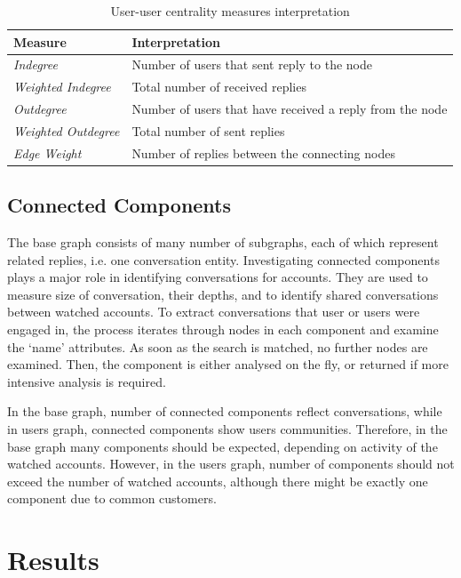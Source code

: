 \documentclass[sigconf]{acmart}
\begin{document}
\begin{table}[!h]
\centering
\begin{tabularx}{\columnwidth}{lX}
\toprule
\textbf{Measure} & \textbf{Interpretation} \\ 
\midrule
{\emph{Indegree}} & Number of users that sent reply to the node \\
{\emph{Weighted Indegree}} & Total number of received replies \\
{\emph{Outdegree}} & Number of users that have received a reply from
                     the node \\ 
{\emph{Weighted Outdegree}} & Total number of sent replies \\
{\emph{Edge Weight}}& Number of replies between the connecting nodes\\
\bottomrule
\end{tabularx}
\caption{User-user centrality measures interpretation}
\label{tbl:uucentralitymeasuresinter}
\end{table}

\subsection{Connected Components}

The base graph consists of many number of subgraphs, each of which
represent related replies, i.e. one conversation entity. Investigating
connected components plays a major role in identifying conversations
for accounts. They are used to measure size of conversation, their
depths, and to identify shared conversations between watched
accounts. To extract conversations that user or users were engaged in,
the process iterates through nodes in each component and examine the
`name' attributes. As soon as the search is matched, no further nodes
are examined. Then, the component is either analysed on the fly, or
returned if more intensive analysis is required.

In the base graph, number of connected components reflect
conversations, while in users graph, connected components show users
communities. Therefore, in the base graph many components should be
expected, depending on activity of the watched accounts. However, in
the users graph, number of components should not exceed the number of
watched accounts, although there might be exactly one component due to
common customers.


\section{Results}\label{results}
\end{document}
